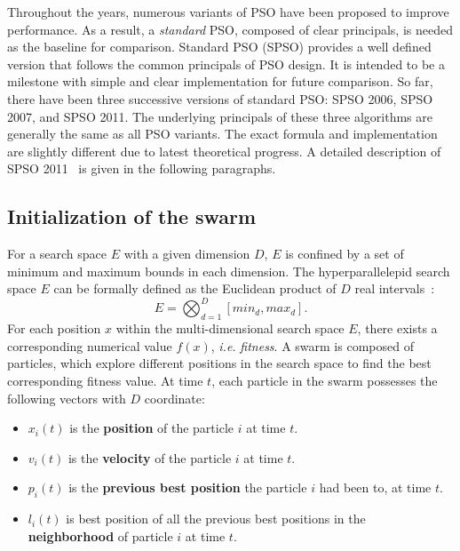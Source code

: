 Throughout the years, numerous variants of PSO have been proposed to improve performance.
As a result, a \textit{standard} PSO, composed of clear principals, is needed as the baseline for comparison.
Standard PSO (SPSO) provides a well defined version that follows the common principals of PSO design.
It is intended to be a milestone with simple and clear implementation for future comparison. %
So far, there have been three successive versions of standard PSO: SPSO 2006, SPSO 2007, and SPSO 2011.
The underlying principals of these three algorithms are generally the same as all PSO variants.
The exact formula and implementation are slightly different due to latest theoretical progress.
A detailed description of SPSO 2011~\cite{Zambrano:2013:SPSO2011} is given in the following paragraphs.

\subsection{Initialization of the swarm}

For a search space $E$ with a given dimension $D$, $E$ is confined by a set of minimum and maximum bounds in each dimension.
The hyperparallelepid search space $E$ can be formally defined as the Euclidean product of $D$ real intervals~\cite{Clerc:2012:SPSO2011}:
\begin{displaymath}
E = \bigotimes_{d=1}^{D}[min_d, max_d].
\end{displaymath}
For each position $x$ within the multi-dimensional search space $E$, there exists a corresponding numerical value $f(x)$, \textit{i.e.} \textit{fitness}.
A swarm is composed of particles, which explore different positions in the search space to find the best corresponding fitness value.
At time $t$, each particle in the swarm possesses the following vectors with $D$ coordinate:
\begin{itemize}
\item $x_i(t)$ is the \textbf{position} of the particle $i$ at time $t$.
\item $v_i(t)$ is the \textbf{velocity} of the particle $i$ at time $t$.
\item $p_i(t)$ is the \textbf{previous best position} the particle $i$ had been to, at time $t$.
\item $l_i(t)$ is best position of all the previous best positions in the \textbf{neighborhood} of particle $i$ at time $t$.
\end{itemize}

